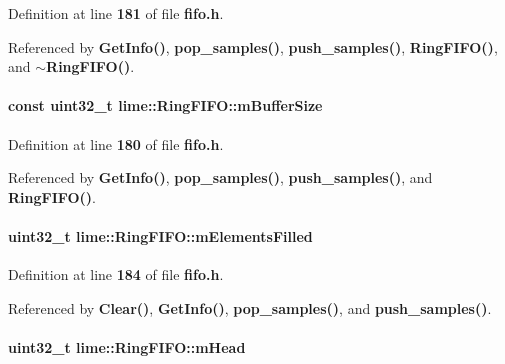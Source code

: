 Definition at line {\bf 181} of file {\bf fifo.\+h}.



Referenced by {\bf Get\+Info()}, {\bf pop\+\_\+samples()}, {\bf push\+\_\+samples()}, {\bf Ring\+F\+I\+F\+O()}, and {\bf $\sim$\+Ring\+F\+I\+F\+O()}.

\paragraph[{m\+Buffer\+Size}]{\setlength{\rightskip}{0pt plus 5cm}const uint32\+\_\+t lime\+::\+Ring\+F\+I\+F\+O\+::m\+Buffer\+Size\hspace{0.3cm}{\ttfamily [protected]}}\label{classlime_1_1RingFIFO_a3d252067ce4324188b1bc46459e7678a}


Definition at line {\bf 180} of file {\bf fifo.\+h}.



Referenced by {\bf Get\+Info()}, {\bf pop\+\_\+samples()}, {\bf push\+\_\+samples()}, and {\bf Ring\+F\+I\+F\+O()}.

\paragraph[{m\+Elements\+Filled}]{\setlength{\rightskip}{0pt plus 5cm}uint32\+\_\+t lime\+::\+Ring\+F\+I\+F\+O\+::m\+Elements\+Filled\hspace{0.3cm}{\ttfamily [protected]}}\label{classlime_1_1RingFIFO_a48d0a36f75ecde0cd9b1dc6e47042d20}


Definition at line {\bf 184} of file {\bf fifo.\+h}.



Referenced by {\bf Clear()}, {\bf Get\+Info()}, {\bf pop\+\_\+samples()}, and {\bf push\+\_\+samples()}.

\paragraph[{m\+Head}]{\setlength{\rightskip}{0pt plus 5cm}uint32\+\_\+t lime\+::\+Ring\+F\+I\+F\+O\+::m\+Head\hspace{0.3cm}{\ttfamily [protected]}}\label{classlime_1_1RingFIFO_afe97521130b0ad257f4cf2dea3f1a699}


